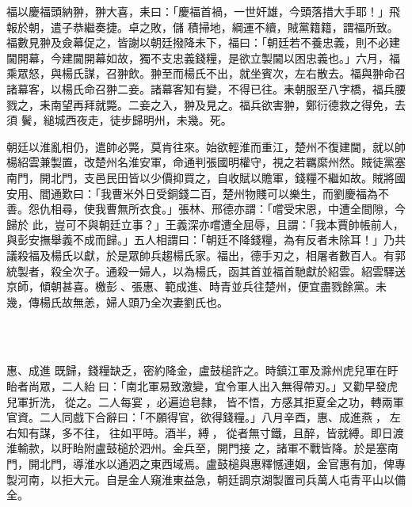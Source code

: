 \begin{pinyinscope}
 福以慶福頭納翀，翀大喜，耒曰：「慶福首禍，一世奸雄，今頭落措大手耶！」飛報於朝，遣子恭繼奏捷。卓之敗，儲
 積掃地，綱運不續，賊黨籍籍，謂福所致。福數見翀及僉幕促之，皆謝以朝廷撥降未下，福曰：「朝廷若不養忠義，則不必建閫開幕，今建閫開幕如故，獨不支忠義錢糧，是欲立製閫以困忠義也。」六月，福乘眾怒，與楊氏謀，召翀飲。翀至而楊氏不出，就坐賓次，左右散去。福與翀命召諸幕客，以楊氏命召翀二妾。諸幕客知有變，不得已往。耒朝服至八字橋，福兵腰戮之，耒南望再拜就斃。二妾之入，翀及見之。福兵欲害翀，鄭衍德救之得免，去須
 鬢，縋城西夜走，徒步歸明州，未幾。死。



 朝廷以淮亂相仍，遣帥必斃，莫肯往來。始欲輕淮而重江，楚州不復建閫，就以帥楊紹雲兼製置，改楚州名淮安軍，命通判張國明權守，視之若羈縻州然。賊徒黨塞南門，開北門，支邑民田皆以少價抑買之，自收賦以贍軍，錢糧不繼如故。賊將國安用、閻通歎曰：「我曹米外日受銅錢二百，楚州物賤可以樂生，而劉慶福為不善。怨仇相尋，使我曹無所衣食。」張林、邢德亦謂：「嚐受宋恩，中遭全間隙，今歸於
 此，豈可不與朝廷立事？」王義深亦嚐遭全屈辱，且謂：「我本賈帥帳前人，與彭安撫舉義不成而歸。」五人相謂曰：「朝廷不降錢糧，為有反者未除耳！」乃共議殺福及楊氏以獻，於是眾帥兵趨楊氏家。福出，德手刃之，相屠者數百人。有郭統製者，殺全次子。通殺一婦人，以為楊氏，函其首並福首馳獻於紹雲。紹雲驛送京師，傾朝甚喜。檄彭𢖲、張惠、範成進、時青並兵往楚州，便宜盡戮餘黨。未幾，傳楊氏故無恙，婦人頭乃全次妻劉氏也。



 𢖲輕儇，每
 供四總管弄戲，得檄不敢自決，力遜。惠、成進二人即提兵入楚城，與林等五人歡宴，議分北軍為五，使五人分掌之，每軍無過千人，一屯南渡門，一屯平河橋，一屯北神鎮，城中城西各一；在山東人老幼並絕錢糧，出淮陰戰艦，陳淮岸以斷全歸路，請製府及朝廷處之。廟議謂青望重，惟聽青區畫。省檄之下，不及惠、成進。青亦恐禍及，密遣人報全於青州，遷延不決。惠等歸盱眙，賊黨復振。紹雲赴樞密稟議，淮東總領岳珂攝製府事。



 惠、成進
 既歸，錢糧缺乏，密約降金，盧鼓槌許之。時鎮江軍及滁州虎兒軍在盱眙者尚眾，二人紿𢖲曰：「南北軍易致激變，宜令軍人出入無得帶刃。」又勸早發虎兒軍折洗，𢖲從之。二人每宴𢖲，必遍迨皂隸，𢖲皆不悟，方感其拒夏全之功，轉兩軍官資。二人同戲下合辭曰：「不願得官，欲得錢糧。」八月辛酉，惠、成進燕𢖲，𢖲左右知有謀，多不往，𢖲往如平時。酒半，縛𢖲，𢖲從者無寸鐵，且醉，皆就縛。即日渡淮輸款，以盱眙附盧鼓槌於泗州。金兵至，開門接
 之，諸軍不戰皆降。於是塞南門，開北門，導淮水以通泗之東西域焉。盧鼓槌與惠釋憾連姻，金官惠有加，俾專製河南，以拒大元。自是金人窺淮東益急，朝廷調京湖製置司兵萬人屯青平山以備全。




\end{pinyinscope}
